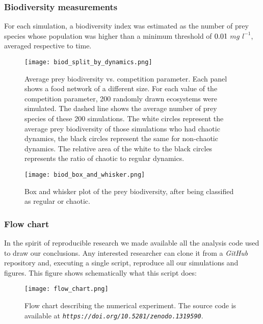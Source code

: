 \subsubsection{Biodiversity measurements}
\label{subsubsec:BiodiversityFigs}

For each simulation, a biodiversity index was estimated as the number of prey species whose population was higher than a minimum threshold of $0.01$ $mg$ $l^{-1}$, averaged respective to time.

\begin{figure}[H]
	\begin{center}
		\texttt{[image: biod\_split\_by\_dynamics.png]}
	\end{center}
	\caption{Average prey biodiversity vs. competition parameter. Each panel shows a food network of a different size. For each value of the competition parameter, 200 randomly drawn ecosystems were simulated. The dashed line shows the average number of prey species of these 200 simulations. The white circles represent the average prey biodiversity of those simulations who had chaotic dynamics, the black circles represent the same for non-chaotic dynamics. The relative area of the white to the black circles represents the ratio of chaotic to regular dynamics.}
	\label{fig:BiodSplitByChaos}
\end{figure}

\begin{figure}[H]
	\begin{center}
		\texttt{[image: biod\_box\_and\_whisker.png]}
	\end{center}
	\caption{Box and whisker plot of the prey biodiversity, after being classified as regular or chaotic.}
	\label{fig:BiodBoxAndWhisker}
\end{figure}

\subsubsection{Flow chart}
\label{subsubsec:FlowChart}
In the spirit of reproducible research we made available all the analysis code used to draw our conclusions. Any interested researcher can clone it from a \textit{GitHub} repository \citep{Rodriguez-Sanchez-code-neuchaos} and, executing a single script, reproduce all our simulations and figures. This figure shows schematically what this script does:

\begin{figure}[H]
	\begin{center}
		\texttt{[image: flow\_chart.png]}
	\end{center}
	\caption{Flow chart describing the numerical experiment. The source code is available at \textit{\texttt{https://doi.org/10.5281/zenodo.1319590}}.}
	\label{fig:FlowChart}
\end{figure}
